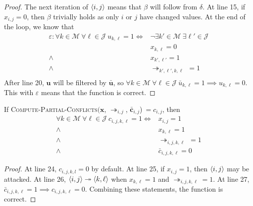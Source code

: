 \begin{lemma}
\begin{proof}
		The next iteration of $\langle{i},{j}\rangle$ means that $\beta$ will follow from $\delta$. At line 15, if $x_{i,j}=0$, then $\beta$ trivially holds as only $i$ or $j$ have changed values. At the end of the loop, we know that
		\begin{align*}
			\varepsilon: \forall k\in\mathcal{M}\ \forall\ell\in\mathcal{J}\ u_{k,\ell}=1\iff&\neg\exists k'\in\mathcal{M}\ \exists\ell'\in\mathcal{J}\\
			&x_{k,\ell}=0\\
			\land\ &x_{k',\ell'}=1\\
			\land\ &\twoheadrightarrow_{k',\ell',k,\ell}\ =1\\
		\end{align*}
		After line 20, $\mathbf{u}$ will be filtered by $\bar{\mathbf{u}}$, so $\forall k\in\mathcal{M}\ \forall\ell\in\mathcal{J}\ \bar{u}_{k,\ell}=1\implies u_{k,\ell}=0$. This with $\varepsilon$ means that the function is correct.

	\end{proof}
\end{lemma}
	
\begin{lemma}
	\label{computepartialconflicts}
	
	If \textsc{Compute-Partial-Conflicts}$(\mathbf{x}$, $\twoheadrightarrow_{i,j}$, $\bar{\mathbf{c}}_{i,j}$)$\ =c_{i,j}$, then
	\begin{align*}
		\forall k\in\mathcal{M}\ \forall\ell\in\mathcal{J}\ c_{i,j,k,\ell}=1\iff&x_{i,j}=1\\
		\land\ &x_{k,\ell}=1\\
		\land\ &\twoheadrightarrow_{i,j,k,\ell}\ =1\\
		\land\ &\bar{c}_{i,j,k,\ell}=0
	\end{align*}
	
	\begin{proof}
		At line 24, $c_{i,j,k,l}=0$ by default. At line 25, if $x_{i,j}=1$, then $\langle{i},{j}\rangle$ may be attacked. At line 26, $\langle{i},{j}\rangle\twoheadrightarrow\langle{k},{\ell}\rangle$ when $x_{k,\ell}=1$ and $\twoheadrightarrow_{i,j,k,\ell}=1$. At line 27, $\bar{c}_{i,j,k,\ell}=1\implies c_{i,j,k,\ell}=0$. Combining these statements, the function is correct.
	\end{proof}
\end{lemma}


